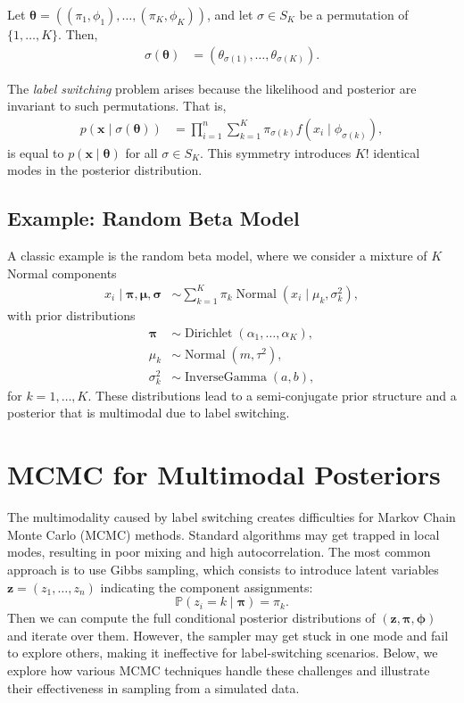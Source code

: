\documentclass[11pt]{article}
\newcommand{\bx}{\boldsymbol{x}}
\newcommand{\btheta}{\boldsymbol{\theta}}
\newcommand{\bpi}{\boldsymbol{\pi}}
\newcommand{\bmu}{\boldsymbol{\mu}}
\newcommand{\bsigma}{\boldsymbol{\sigma}}
\newcommand{\bz}{\boldsymbol{z}}
\newcommand{\bphi}{\boldsymbol{\phi}}
\newcommand{\pr}{\mathbb{P}}
\begin{document}
Let $\btheta = \left( (\pi_1, \phi_1), \ldots, (\pi_K, \phi_K) \right)$, and let $\sigma \in S_K$ 
be a permutation of $\{1, \ldots, K\}$. Then,
\begin{align*}
    \sigma(\btheta) &= \left( \theta_{\sigma(1)}, \ldots, \theta_{\sigma(K)} \right).
\end{align*}

The \emph{label switching} problem arises because the likelihood and posterior are invariant to 
such permutations. That is,
\begin{align*}
    p(\bx \mid \sigma(\btheta)) &= \prod_{i=1}^{n} \sum_{k=1}^{K} \pi_{\sigma(k)} 
    f(x_i \mid \phi_{\sigma(k)}),
\end{align*}
is equal to $p(\bx \mid \btheta)$ for all $\sigma \in S_K$. This symmetry introduces $K!$ identical
modes in the posterior distribution.

\subsection{Example: Random Beta Model}

A classic example is the random beta model, where we consider a mixture of $K$ Normal components
\begin{align*}
    x_i \mid \bpi, \bmu, \bsigma &\sim \sum_{k=1}^{K} \pi_k \operatorname{Normal}(x_i \mid \mu_k, \sigma_k^2),
\end{align*}
with prior distributions
\begin{align*}
    \bpi &\sim \operatorname{Dirichlet}(\alpha_1, \ldots, \alpha_K), \\
    \mu_k &\sim \operatorname{Normal}(m, \tau^2), \\
    \sigma_k^2 &\sim \operatorname{InverseGamma}(a, b),
\end{align*}
for $k = 1, \ldots, K$. These distributions lead to a semi-conjugate prior structure and a posterior
that is multimodal due to label switching.

\section{MCMC for Multimodal Posteriors}

The multimodality caused by label switching creates difficulties for Markov Chain Monte Carlo (MCMC) 
methods. Standard algorithms may get trapped in local modes, resulting in poor mixing and high 
autocorrelation. The most common approach is to use Gibbs sampling, which consists to introduce latent 
variables $\bz = (z_1, \ldots, z_n)$ indicating the component assignments:
\[
    \pr(z_i = k \mid \bpi) = \pi_k.
\]
Then we can compute the full conditional posterior distributions of $(\bz, \bpi, \bphi)$ and iterate
over them. However, the sampler may get stuck in one mode and fail to explore others, making it ineffective 
for label-switching scenarios. Below, we explore how various MCMC techniques handle these challenges and 
illustrate their effectiveness in sampling from a simulated data.
\end{document}
